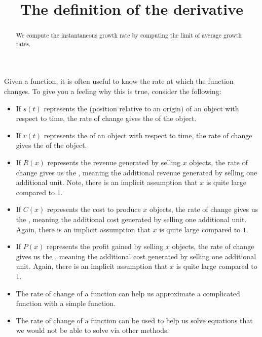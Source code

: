 \documentclass{ximera}
\title[Dig-In:]{The definition of the derivative}
\begin{document}
\begin{abstract}
We compute the instantaneous growth rate by computing the limit of
average growth rates.
\end{abstract}
\maketitle


Given a function, it is often useful to know the rate at which the
function changes. To give you a feeling why this is true, consider the
following:
\begin{itemize}
\item If $s(t)$ represents the  (position relative to an
  origin) of an object with respect to time, the rate of change gives
  the  of the object.
\item If $v(t)$ represents the  of an object with respect to
  time, the rate of change gives the  of the object.
\item If $R(x)$ represents the revenue generated by selling $x$
  objects, the rate of change gives us the ,
  meaning the additional revenue generated by selling one additional
  unit. Note, there is an implicit assumption that $x$ is quite large
  compared to $1$.
\item If $C(x)$ represents the cost to produce $x$ objects, the rate
  of change gives us the , meaning the
  additional cost generated by selling one additional unit. Again,
  there is an implicit assumption that $x$ is quite large compared to
  $1$.
\item If $P(x)$ represents the profit gained by selling $x$ objects,
  the rate of change gives us the , meaning
  the additional cost generated by selling one additional unit. Again,
  there is an implicit assumption that $x$ is quite large compared to
  $1$.
\item The rate of change of a function can help us approximate a
  complicated function with a simple function.
\item The rate of change of a function can be used to help us solve
  equations that we would not be able to solve via other methods.
\end{itemize}

\end{document}
